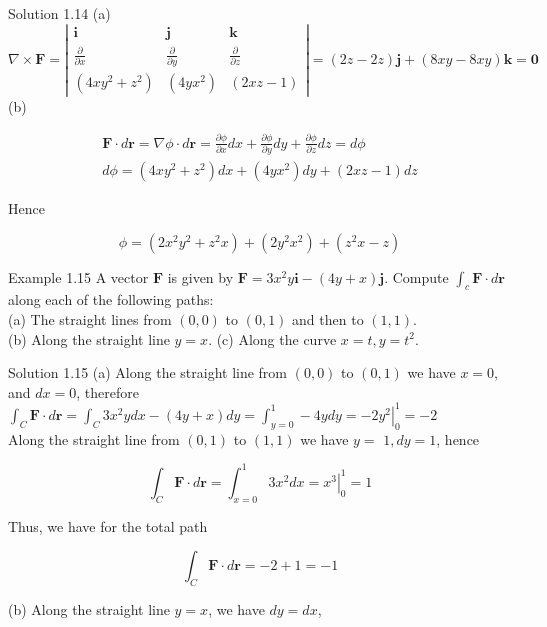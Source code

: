 \documentclass[10pt]{article}
\begin{document}
Solution 1.14 (a)\\
$\nabla \times \mathbf{F}=\left|\begin{array}{lll}\mathbf{i} & \mathbf{j} & \mathbf{k} \\ \frac{\partial}{\partial x} & \frac{\partial}{\partial y} & \frac{\partial}{\partial z} \\ \left(4 x y^{2}+z^{2}\right) & \left(4 y x^{2}\right) & (2 x z-1)\end{array}\right|=(2 z-2 z) \mathbf{j}+(8 x y-8 x y) \mathbf{k}=\mathbf{0}$\\
(b)

$$
\begin{gathered}
\mathbf{F} \cdot d \mathbf{r}=\nabla \phi \cdot d \mathbf{r}=\frac{\partial \phi}{\partial x} d x+\frac{\partial \phi}{\partial y} d y+\frac{\partial \phi}{\partial z} d z=d \phi \\
d \phi=\left(4 x y^{2}+z^{2}\right) d x+\left(4 y x^{2}\right) d y+(2 x z-1) d z
\end{gathered}
$$

Hence

$$
\phi=\left(2 x^{2} y^{2}+z^{2} x\right)+\left(2 y^{2} x^{2}\right)+\left(z^{2} x-z\right)
$$

Example 1.15 A vector $\mathbf{F}$ is given by $\mathbf{F}=3 x^{2} y \mathbf{i}-(4 y+x) \mathbf{j}$. Compute $\int_{c} \mathbf{F} \cdot d \mathbf{r}$ along each of the following paths:\\
(a) The straight lines from $(0,0)$ to $(0,1)$ and then to $(1,1)$.\\
(b) Along the straight line $y=x$. (c) Along the curve $x=t, y=t^{2}$.

Solution 1.15 (a) Along the straight line from $(0,0)$ to $(0,1)$ we have $x=0$, and $d x=0$, therefore\\
$\int_{C} \mathbf{F} \cdot d \mathbf{r}=\int_{C} 3 x^{2} y d x-(4 y+x) d y=\int_{y=0}^{1}-4 y d y=-\left.2 y^{2}\right|_{0} ^{1}=-2$\\
Along the straight line from $(0,1)$ to $(1,1)$ we have $y=$ $1, d y=1$, hence

$$
\int_{C} \mathbf{F} \cdot d \mathbf{r}=\int_{x=0}^{1} 3 x^{2} d x=\left.x^{3}\right|_{0} ^{1}=1
$$

Thus, we have for the total path

$$
\int_{C} \mathbf{F} \cdot d \mathbf{r}=-2+1=-1
$$

(b) Along the straight line $y=x$, we have $d y=d x$,
\end{document}
